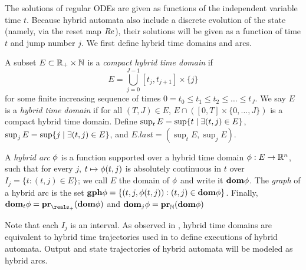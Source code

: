 The solutions of regular ODEs are given as functions of the independent variable time $t$.
Because hybrid automata also include a discrete evolution of the state (namely, via the reset map $Re$), their solutions will be given as a function of time $t$ and jump number $j$.
We first define hybrid time domains and arcs.
\begin{defn}
	\label{def:hybridarcs}
	A subset $E \subset \mathbb{R}_+\times \mathbb{N}$ is a \emph{compact hybrid time domain} if 
	\[E = \bigcup_{j=0}^{J-1}[t_j,t_{j+1}]\times \{j\}\]
	for some finite increasing sequence of times $0=t_0 \leq t_1 \leq t_2 \leq \ldots \leq t_J$.
	We say $E$ is a \emph{hybrid time domain} if for all $(T,J) \in E$, 
	$E \cap ([0,T]\times \{0,\ldots,J\})$ is a compact hybrid time domain.
	Define
	$\sup_t E = \sup \{t \;|\; \exists (t,j) \in E\}$, $\sup_j E = \sup \{j \;|\; \exists (t,j) \in E\}$,
	and $E.last = (\sup_t E, \sup_j E)$.
	
	A \emph{hybrid arc} $\mathbf{\phi}$ is a function supported over a hybrid time domain $\mathbf{\phi}:E \rightarrow \mathbb{R}^n$, 
	such that for every $j$, $t \mapsto \mathbf{\phi}(t,j)$ is absolutely continuous in $t$ over $I_j = \{t: (t,j) \in E\}$;
	we call $E$ the domain of $\mathbf{\phi}$ and write it $\mathbf{dom} \mathbf{\phi}$.
	The \emph{graph} of a hybrid arc is the set $\mathbf{gph} \mathbf{\phi} = \{(t,j,\mathbf{\phi}(t,j)): (t,j) \in \mathbf{dom} \mathbf{\phi}\}$.
	Finally, $\dom_t \hstraj = \proj{\dom \hstraj}{\nnreals}$ and $\mathbf{dom}_j \mathbf{\phi} = {\bf pr}_{\mathbb{N}}(\mathbf{dom} \mathbf{\phi})$
\end{defn}

Note that each $I_j$ is an interval.
As observed in \cite{SanfeliceT10automatica}, hybrid time domains are equivalent to hybrid time trajectories used in \cite{LygerosJSZS03tac} to define executions of hybrid automata.
Output and state trajectories of hybrid automata will be modeled as hybrid arcs. 

